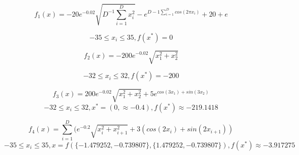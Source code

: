 \documentclass[10pt]{article}
\begin{document}
$$f_1(x) = -20e^{-0.02}\sqrt{D^{-1}\sum_{i=1}^{D}x_{i}^2}-e^{D-1\sum_{i=1}^{D}cos(2\pi x_i)}+20+e$$

$$-35\leq x_i \leq 35, f(x^*) = 0$$

$$f_2(x) = -200e^{-0.02}\sqrt{x_1^2+x_2^2}$$

$$-32\leq x_i \leq 32, f(x^*) = -200$$

$$f_3(x) = 200e^{-0.02}\sqrt{x_1^2+x_2^2}+5e^{cos(3x_1)+sin(3x_2)}$$
$$-32\leq x_i \leq 32, x^* = (0, \approx -0.4), f(x^*) \approx -219.1418$$

$$f_4(x) = \sum_{i=1}^{D}(e^{-0.2}\sqrt{x_i^2+x_{i+1}^2}+3(cos(2x_i)+sin(2x_{i+1}))$$
$$-35\leq x_i \leq 35, x=f(\{-1.479252,-0.739807\},\{1.479252,-0.739807\}), f(x^*) \approx -3.917275$$
\end{document}
